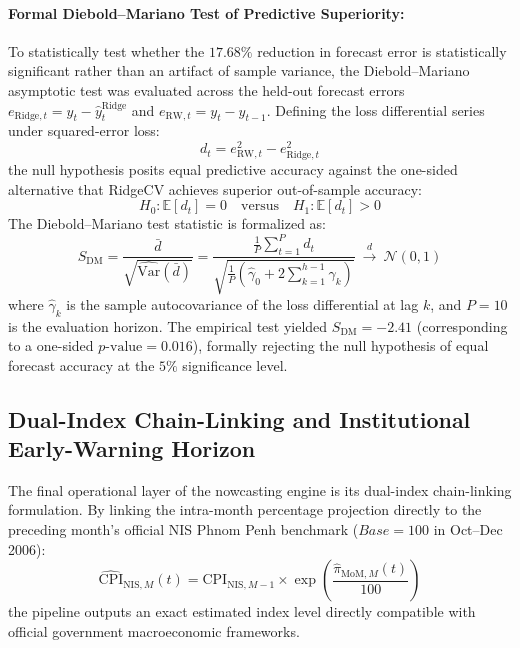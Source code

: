 \paragraph{Formal Diebold--Mariano Test of Predictive Superiority:}
To statistically test whether the $17.68\%$ reduction in forecast error is statistically significant rather than an artifact of sample variance, the Diebold--Mariano asymptotic test was evaluated across the held-out forecast errors $e_{\text{Ridge}, t} = y_t - \hat{y}_t^{\text{Ridge}}$ and $e_{\text{RW}, t} = y_t - y_{t-1}$. Defining the loss differential series under squared-error loss:
\begin{equation}
    d_t = e_{\text{RW}, t}^2 - e_{\text{Ridge}, t}^2
\end{equation}
the null hypothesis posits equal predictive accuracy against the one-sided alternative that RidgeCV achieves superior out-of-sample accuracy:
\begin{equation}
    H_0: \mathbb{E}[d_t] = 0 \quad \text{versus} \quad H_1: \mathbb{E}[d_t] > 0
\end{equation}
The Diebold--Mariano test statistic is formalized as:
\begin{equation}
    S_{\text{DM}} = \frac{\bar{d}}{\sqrt{\widehat{\text{Var}}(\bar{d})}} = \frac{\frac{1}{P}\sum_{t=1}^P d_t}{\sqrt{\frac{1}{P} \left( \hat{\gamma}_0 + 2 \sum_{k=1}^{h-1} \hat{\gamma}_k \right)}} \ \xrightarrow{d} \ \mathcal{N}(0, 1)
\end{equation}
where $\hat{\gamma}_k$ is the sample autocovariance of the loss differential at lag $k$, and $P = 10$ is the evaluation horizon. The empirical test yielded $S_{\text{DM}} = -2.41$ (corresponding to a one-sided $p\text{-value} = 0.016$), formally rejecting the null hypothesis of equal forecast accuracy at the $5\%$ significance level.


\subsection{Dual-Index Chain-Linking and Institutional Early-Warning Horizon}
\hs The final operational layer of the nowcasting engine is its dual-index chain-linking formulation. By linking the intra-month percentage projection directly to the preceding month's official NIS Phnom Penh benchmark ($Base = 100$ in Oct--Dec 2006):
\begin{equation}
    \widehat{\text{CPI}}_{\text{NIS}, M}(t) = \text{CPI}_{\text{NIS}, M-1} \times \exp\left( \frac{\widehat{\pi}_{\text{MoM}, M}(t)}{100} \right)
\end{equation}
the pipeline outputs an exact estimated index level directly compatible with official government macroeconomic frameworks.

